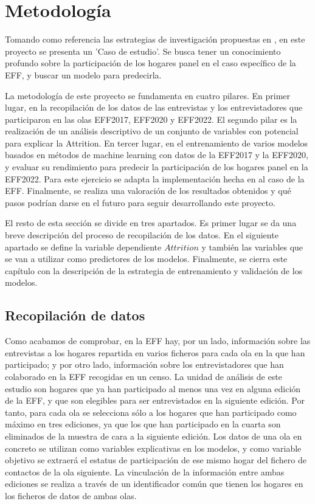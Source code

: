 \section{Metodología}

Tomando como referencia las estrategias de investigación propuestas en \cite{oates2022researching}, en este proyecto se presenta un 'Caso de estudio'. Se busca tener un conocimiento profundo sobre la participación de los hogares panel en el caso específico de la EFF, y buscar un modelo para predecirla.

La metodología de este proyecto se fundamenta en cuatro pilares. En primer lugar, en la recopilación de los datos de las entrevistas y los entrevistadores que participaron en las olas EFF2017, EFF2020 y EFF2022. El segundo pilar es la realización de un análisis descriptivo de un conjunto de variables con potencial para explicar la Attrition. En tercer lugar, en el entrenamiento de varios modelos basados en métodos de machine learning con datos de la EFF2017 y la EFF2020, y evaluar su rendimiento para predecir la participación de los hogares panel en la EFF2022. Para este ejercicio se adapta la implementación hecha en \cite{beste2023case} al caso de la EFF. Finalmente, se realiza una valoración de los resultados obtenidos y qué pasos podrían darse en el futuro para seguir desarrollando este proyecto.

El resto de esta sección se divide en tres apartados. Es primer lugar se da una breve descripción del proceso de recopilación de los datos. En el siguiente apartado se define la variable dependiente $Attrition$ y también las variables que se van a utilizar como predictores de los modelos. Finalmente, se cierra este capítulo con la descripción de la estrategia de entrenamiento y validación de los modelos.

\subsection*{Recopilación de datos}

Como acabamos de comprobar, en la EFF hay, por un lado, información sobre las entrevistas a los hogares repartida en varios ficheros para cada ola en la que han participado; y por otro lado, información sobre los entrevistadores que han colaborado en la EFF recogidas en un censo. La unidad de análisis de este estudio son hogares que ya han participado al menos una vez en alguna edición de la EFF, y que son elegibles para ser entrevistados en la siguiente edición. Por tanto, para cada ola se selecciona sólo a los hogares que han participado como máximo en tres ediciones, ya que los que han participado en la cuarta son eliminados de la muestra de cara a la siguiente edición. Los datos de una ola en concreto se utilizan como variables explicativas en los modelos, y como variable objetivo se extraerá el estatus de participación de ese mismo hogar del fichero de contactos de la ola siguiente. La vinculación de la información entre ambas ediciones se realiza a través de un identificador común que tienen los hogares en los ficheros de datos de ambas olas.

